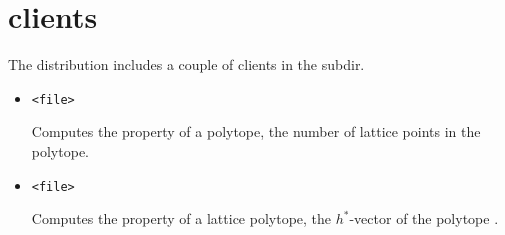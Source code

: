 \section{\texorpdfstring{\protect{} clients}
{polymake clients}}

The  distribution includes a couple
of   clients in the
 subdir.

\begin{itemize}
\item
{} \verb+<file>+

Computes the property  of a polytope,
the number of lattice points in the polytope.

\item
{} \verb+<file>+

Computes the property  of a lattice polytope,
the $h^*$-vector of the polytope .
\end{itemize}
